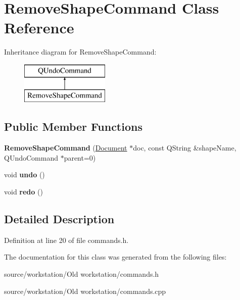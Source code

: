 \hypertarget{class_remove_shape_command}{\section{Remove\-Shape\-Command Class Reference}
\label{class_remove_shape_command}
}
Inheritance diagram for Remove\-Shape\-Command\-:\begin{figure}[H]
\begin{center}
\leavevmode
\includegraphics[height=2.000000cm]{class_remove_shape_command}
\end{center}
\end{figure}
\subsection*{Public Member Functions}
\begin{DoxyCompactItemize}
\item 
\hypertarget{class_remove_shape_command_a002e4764725ee934fbea164d1e8c7666}{{\bfseries Remove\-Shape\-Command} (\hyperlink{class_document}{Document} $\ast$doc, const Q\-String \&shape\-Name, Q\-Undo\-Command $\ast$parent=0)}\label{class_remove_shape_command_a002e4764725ee934fbea164d1e8c7666}

\item 
\hypertarget{class_remove_shape_command_a73662cc9f94dc620f59ea5c134423ea3}{void {\bfseries undo} ()}\label{class_remove_shape_command_a73662cc9f94dc620f59ea5c134423ea3}

\item 
\hypertarget{class_remove_shape_command_a74982cb90f747d6e386b9568a471cf38}{void {\bfseries redo} ()}\label{class_remove_shape_command_a74982cb90f747d6e386b9568a471cf38}

\end{DoxyCompactItemize}


\subsection{Detailed Description}


Definition at line 20 of file commands.\-h.



The documentation for this class was generated from the following files\-:\begin{DoxyCompactItemize}
\item 
source/workstation/\-Old workstation/commands.\-h\item 
source/workstation/\-Old workstation/commands.\-cpp\end{DoxyCompactItemize}
